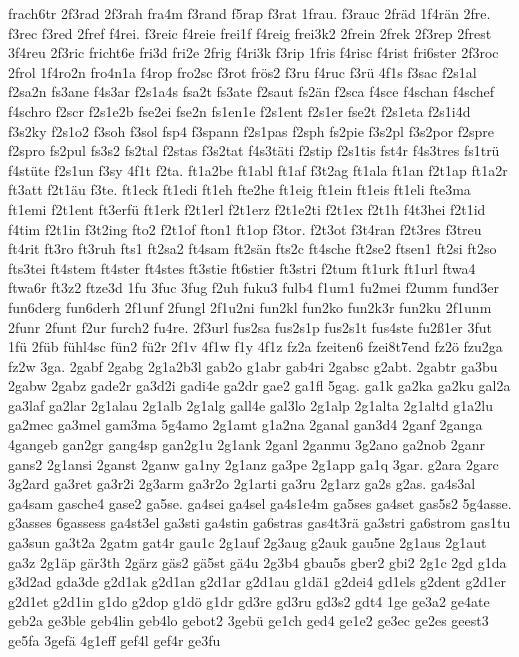{frach6tr
2f3rad
2f3rah
fra4m
f3rand
f5rap
f3rat
1frau.
f3rauc
2fräd
1f4rän
2fre.
f3rec
f3red
2fref
f4rei.
f3reic
f4reie
frei1f
f4reig
frei3k2
2frein
2frek
2f3rep
2frest
3f4reu
2f3ric
fricht6e
fri3d
fri2e
2frig
f4ri3k
f3rip
1fris
f4risc
f4rist
fri6ster
2f3roc
2frol
1f4ro2n
fro4n1a
f4rop
fro2sc
f3rot
frös2
f3ru
f4ruc
f3rü
4f1s
f3sac
f2s1al
f2sa2n
fs3ane
f4s3ar
f2s1a4s
fsa2t
fs3ate
f2saut
fs2än
f2sca
f4sce
f4schan
f4schef
f4schro
f2scr
f2s1e2b
fse2ei
fse2n
fs1en1e
f2s1ent
f2s1er
fse2t
f2s1eta
f2s1i4d
f3s2ky
f2s1o2
f3soh
f3sol
fsp4
f3spann
f2s1pas
f2sph
fs2pie
f3s2pl
f3s2por
f2spre
f2spro
fs2pul
fs3s2
fs2tal
f2stas
f3s2tat
f4s3täti
f2stip
f2s1tis
fst4r
f4s3tres
fs1trü
f4stüte
f2s1un
f3sy
4f1t
f2ta.
ft1a2be
ft1abl
ft1af
f3t2ag
ft1ala
ft1an
f2t1ap
ft1a2r
ft3att
f2t1äu
f3te.
ft1eck
ft1edi
ft1eh
fte2he
ft1eig
ft1ein
ft1eis
ft1eli
fte3ma
ft1emi
f2t1ent
ft3erfü
ft1erk
f2t1erl
f2t1erz
f2t1e2ti
f2t1ex
f2t1h
f4t3hei
f2t1id
f4tim
f2t1in
f3t2ing
fto2
f2t1of
fton1
ft1op
f3tor.
f2t3ot
f3t4ran
f2t3res
f3treu
ft4rit
ft3ro
ft3ruh
fts1
ft2sa2
ft4sam
ft2sän
fts2c
ft4sche
ft2se2
ftsen1
ft2si
ft2so
fts3tei
ft4stem
ft4ster
ft4stes
ft3stie
ft6stier
ft3stri
f2tum
ft1urk
ft1url
ftwa4
ftwa6r
ft3z2
ftze3d
1fu
3fuc
3fug
f2uh
fuku3
fulb4
f1um1
fu2mei
f2umm
fund3er
fun6derg
fun6derh
2f1unf
2fungl
2f1u2ni
fun2kl
fun2ko
fun2k3r
fun2ku
2f1unm
2funr
2funt
f2ur
furch2
fu4re.
2f3url
fus2sa
fus2s1p
fus2s1t
fus4ste
fu2ß1er
3fut
1fü
2füb
fühl4sc
fün2
fü2r
2f1v
4f1w
f1y
4f1z
fz2a
fzeiten6
fzei8t7end
fz2ö
fzu2ga
fz2w
3ga.
2gabf
2gabg
2g1a2b3l
gab2o
g1abr
gab4ri
2gabsc
g2abt.
2gabtr
ga3bu
2gabw
2gabz
gade2r
ga3d2i
gadi4e
ga2dr
gae2
ga1fl
5gag.
ga1k
ga2ka
ga2ku
gal2a
ga3laf
ga2lar
2g1alau
2g1alb
2g1alg
gall4e
gal3lo
2g1alp
2g1alta
2g1altd
g1a2lu
ga2mec
ga3mel
gam3ma
5g4amo
2g1amt
g1a2na
2ganal
gan3d4
2ganf
2ganga
4gangeb
gan2gr
gang4sp
gan2g1u
2g1ank
2ganl
2ganmu
3g2ano
ga2nob
2ganr
gans2
2g1ansi
2ganst
2ganw
ga1ny
2g1anz
ga3pe
2g1app
ga1q
3gar.
g2ara
2garc
3g2ard
ga3ret
ga3r2i
2g3arm
ga3r2o
2g1arti
ga3ru
2g1arz
ga2s
g2as.
ga4s3al
ga4sam
gasche4
gase2
ga5se.
ga4sei
ga4sel
ga4s1e4m
ga5ses
ga4set
gas5s2
5g4asse.
g3asses
6gassess
ga4st3el
ga3sti
ga4stin
ga6stras
gas4t3rä
ga3stri
ga6strom
gas1tu
ga3sun
ga3t2a
2gatm
gat4r
gau1c
2g1auf
2g3aug
g2auk
gau5ne
2g1aus
2g1aut
ga3z
2g1äp
gär3th
2gärz
gäs2
gä5st
gä4u
2g3b4
gbau5s
gber2
gbi2
2g1c
2gd
g1da
g3d2ad
gda3de
g2d1ak
g2d1an
g2d1ar
g2d1au
g1dä1
g2dei4
gd1els
g2dent
g2d1er
g2d1et
g2d1in
g1do
g2dop
g1dö
g1dr
gd3re
gd3ru
gd3s2
gdt4
1ge
ge3a2
ge4ate
geb2a
ge3ble
geb4lin
geb4lo
gebot2
3gebü
ge1ch
ged4
ge1e2
ge3ec
ge2es
geest3
ge5fa
3gefä
4g1eff
gef4l
gef4r
ge3fu
}
